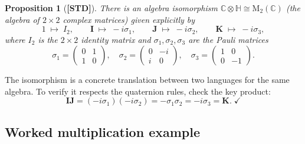 \documentclass[12pt,a4paper]{article}
\newtheorem{proposition}[theorem]{Proposition}
\theoremstyle{definition}
\theoremstyle{remark}
\begin{document}
\begin{proposition}[\textbf{[STD]}]
  \label{prop:pauli_iso}
  There is an algebra isomorphism
  $\mathbb{C}\otimes\mathbb{H} \cong \mathrm{M}_2(\mathbb{C})$
  (the algebra of $2\times 2$ complex matrices) given explicitly by
  \begin{equation}
    \label{eq:pauli_map}
    1 \;\mapsto\; I_2,
    \qquad
    \mathbf{I} \;\mapsto\; -i\sigma_1,
    \qquad
    \mathbf{J} \;\mapsto\; -i\sigma_2,
    \qquad
    \mathbf{K} \;\mapsto\; -i\sigma_3,
  \end{equation}
  where $I_2$ is the $2\times 2$ identity matrix and $\sigma_1,\sigma_2,\sigma_3$
  are the Pauli matrices
  \begin{equation}
    \label{eq:pauli_matrices}
    \sigma_1 = \begin{pmatrix}0&1\\1&0\end{pmatrix},
    \quad
    \sigma_2 = \begin{pmatrix}0&-i\\i&0\end{pmatrix},
    \quad
    \sigma_3 = \begin{pmatrix}1&0\\0&-1\end{pmatrix}.
  \end{equation}
\end{proposition}

\noindent
The isomorphism is a concrete translation between two languages for the same
algebra.  To verify it respects the quaternion rules, check the key product:
\[
  \mathbf{I}\mathbf{J} = (-i\sigma_1)(-i\sigma_2) = -\sigma_1\sigma_2 = -i\sigma_3 = \mathbf{K}.\;\checkmark
\]

\subsection{Worked multiplication example}
\end{document}
